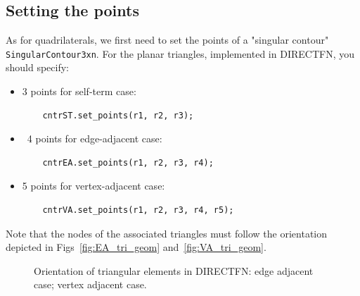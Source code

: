 \documentclass[a4wide,11pt]{article}
\renewcommand{\[}{\begin{equation}}
\renewcommand{\]}{\end{equation}}
\renewcommand{\{}{\begin{eqnarray}}
\renewcommand{\}}{\end{eqnarray}}
\begin{document}
\subsection{Setting the points}
As for quadrilaterals, we first need to set the points of a "singular contour" \texttt{SingularContour3xn}. For the planar triangles, implemented in DIRECTFN, you should specify:
\begin{itemize}
	\item 
	3 points for self-term case:
	\begin{verbatim}
	cntrST.set_points(r1, r2, r3);
	\end{verbatim} 
	\item\
	4 points for edge-adjacent case:
	\begin{verbatim}
	cntrEA.set_points(r1, r2, r3, r4);
	\end{verbatim} 
	\item 
	5 points for vertex-adjacent case:
	\begin{verbatim}
	cntrVA.set_points(r1, r2, r3, r4, r5);
	\end{verbatim} 
\end{itemize}
Note that the nodes of the associated triangles must follow the orientation depicted in Figs~\ref{fig:EA_tri_geom} and~\ref{fig:VA_tri_geom}.
\begin{figure}[h!]
	\hfill
	\caption{Orientation of triangular elements in DIRECTFN:  edge adjacent case;  vertex adjacent case.}
	\label{tri_geom}
\end{figure}
\end{document}
